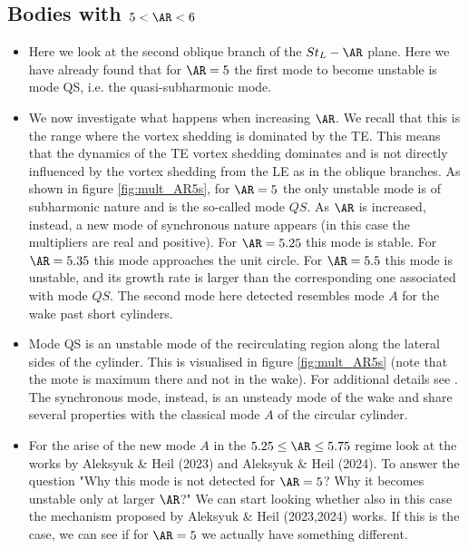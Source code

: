 \documentclass[onecolumn,notitlepage,superscriptaddress, amsmath,amssymb,longbibliographyaps,floatfix]{revtex4-1}
\begin{document}



\subsection{Bodies with $5 < \AR < 6$}

\begin{itemize}
  \item Here we look at the second oblique branch of the $St_L-\AR$ plane. Here we have already found that for $\AR=5$ the first mode to become unstable is mode QS, i.e. the quasi-subharmonic mode.
  \item We now investigate what happens when increasing $\AR$. We recall that this is the range where the vortex shedding is dominated by the TE. This means that the dynamics of the TE vortex shedding dominates and is not directly influenced by the vortex shedding from the LE as in the oblique branches. As shown in figure \ref{fig:mult_AR5s}, for $\AR=5$ the only unstable mode is of subharmonic nature and is the so-called mode $QS$. As $\AR$ is increased, instead, a new mode of synchronous nature appears (in this case the multipliers are real and positive). For $\AR=5.25$ this mode is stable. For $\AR=5.35$ this mode approaches the unit circle. For $\AR=5.5$ this mode is unstable, and its growth rate is larger than the corresponding one associated with mode $QS$. The second mode here detected resembles mode $A$ for the wake past short cylinders. 
  \item Mode QS is an unstable mode of the recirculating region along the lateral sides of the cylinder. This is visualised in figure \ref{fig:mult_AR5s} (note that the mote is maximum there and not in the wake). For additional details see \citep{chiarini-etal-2022}. The synchronous mode, instead, is an unsteady mode of the wake and share several properties with the classical mode $A$ of the circular cylinder.
  \item For the arise of the new mode $A$ in the $5.25 \le \AR \le 5.75$ regime look at the works by Aleksyuk \& Heil (2023) and Aleksyuk \& Heil (2024). To answer the question "Why this mode is not detected for $\AR=5$? Why it becomes unstable only at larger $\AR$?" We can start looking whether also in this case the mechanism proposed by Aleksyuk \& Heil (2023,2024) works. If this is the case, we can see if for $\AR=5$ we actually have something different. 
\end{itemize}
\end{document}
